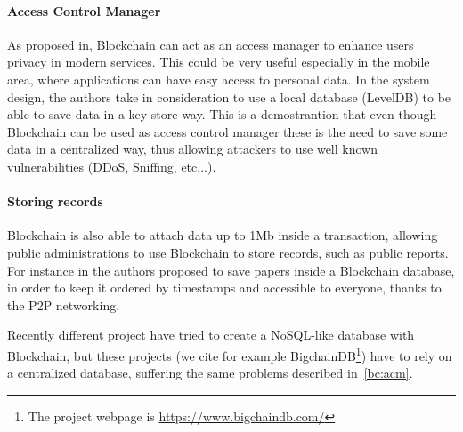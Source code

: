 \paragraph*{Access Control Manager}
\label{bc:acm}

As proposed in\cite{dp15}, Blockchain can act as an access manager to enhance
users privacy in modern services. This could be very useful especially in the
mobile area, where applications can have easy access to personal data. In the
system design, the authors take in consideration to use a local database
(LevelDB) to be able to save data in a key-store way. This is a demostrantion
that even though Blockchain can be used as access control manager these is the
need to save some data in a centralized way, thus allowing attackers to use
well known vulnerabilities (DDoS, Sniffing, etc...).

\paragraph*{Storing records}

Blockchain is also able to attach data up to 1Mb \cite{ectel16} inside a
transaction, allowing public administrations to use Blockchain to store
records, such as public reports. For instance in \cite{ectel16} the authors
proposed to save papers inside a Blockchain database, in order to keep it
ordered by timestamps and accessible to everyone, thanks to the P2P networking.

Recently different project have tried to create a NoSQL-like database with
Blockchain, but these projects (we cite for example BigchainDB\footnote{The
project webpage is \url{https://www.bigchaindb.com/}}) have to rely on a
centralized database, suffering the same problems described in~\ref{bc:acm}.
